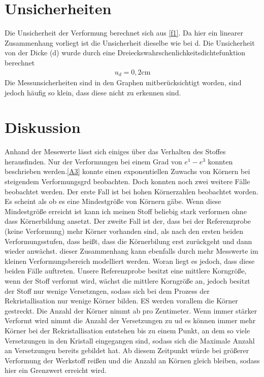 \documentclass[
	a4paper,
	12pt,
	pagesize,
	ngerman
]{scrartcl}
\begin{document}
\section{Unsicherheiten}
Die Unsicherheit der Verformung berechnet sich aus \cref{f1}.
Da hier ein linearer Zusammenhang vorliegt ist die Unsicherheit dieselbe wie bei d. Die Unsicherheit von der Dicke (d) wurde durch eine Dreieckswahrschenlichkeitsdichtefunktion berechnet 
\begin{align*}
    u_d = 0,2\text{cm}
\end{align*}
Die Messunsicherheiten sind in den Graphen mitberücksichtigt worden, sind jedoch häufig so klein, dass diese nicht zu erkennen sind.


\section{Diskussion}
Anhand der Messwerte lässt sich einiges über das Verhalten des Stoffes herausfinden. Nur der Verformungen bei einem Grad von $e^1-e^3$ konnten beschrieben werden.\cref{A3} konnte einen exponentiellen Zuwachs von Körnern bei steigendem Verformungsgrd beobachten. Doch konnten noch zwei weitere Fälle beobachtet werden. Der erste Fall ist bei hohen Körnerzahlen beobachtet worden. Es scheint als ob es eine Mindestgröße von Körnern gäbe. Wenn diese Mindestgröße erreicht ist kann ich meinen Stoff beliebig stark verformen ohne dass Körnerbildung ansetzt. Der zweite Fall ist der, dass bei der Referenzprobe (keine Verformung) mehr Körner vorhanden sind, als nach den ersten beiden Verformungsstufen, dass heißt, dass die Körnerbilung erst zurückgeht und dann wieder anwächst. dieser Zusammenhang kann ebenfalls durch mehr Messwerte im kleinen Verformungsbereich modelliert werden. Woran liegt es jedoch, dass diese beiden Fälle auftreten. Unsere Referenzprobe besitzt eine mittlere Korngröße, wenn der Stoff verformt wird, wächst die mittlere Korngröße an, jedoch besitzt der Stoff nur wenige Versetzngen, sodass sich bei dem Prozess der Rekristallisation nur wenige Körner bilden. ES werden vorallem die Körner gestreckt. Die Anzahl der Körner nimmt ab pro Zentimeter. Wenn immer stärker Verformt wird nimmt die Anzahl der Versetzungen zu ud es können immer mehr Körner bei der Rekristallisation entstehen bis zu einem Punkt, an dem so viele Versetzungen in den Kristall eingegangen sind, sodass sich die Maximale Anzahl an Versetzungen bereits gebildet hat. Ab diesem Zeitpunkt würde bei größerer Verformung der Werkstoff reißen und die Anzahl an Körnen gleich bleiben, sodass hier ein Grenzwert erreicht wird.
\end{document}

